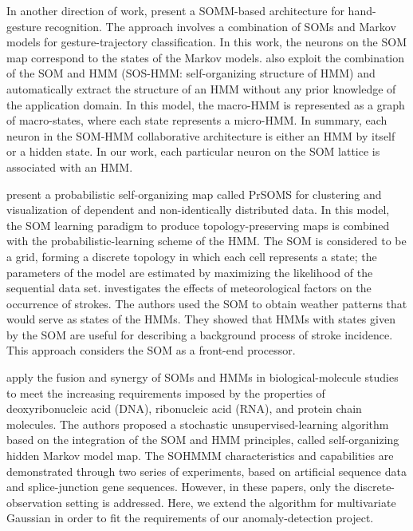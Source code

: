 In another direction of work, \citet{Caridakis2010} present a SOMM-based architecture for hand-gesture recognition. The approach involves a combination of SOMs and Markov models for gesture-trajectory classification. In this work, the neurons on the SOM map correspond to the states of the Markov models. \citet{Jaziri2011} also exploit the combination of the SOM and HMM (SOS-HMM: self-organizing structure of HMM) and automatically extract the structure of an HMM without any prior knowledge of the application domain. In this model, the macro-HMM is represented as a graph of macro-states, where each state represents a micro-HMM. In summary, each neuron in the SOM-HMM collaborative architecture is either an HMM by itself or a hidden state. In our work, each particular neuron on the SOM lattice is associated with an HMM.

\citet{Lebbah2015} present a probabilistic self-organizing map called PrSOMS for clustering and visualization of dependent and non-identically distributed data. In this model, the SOM learning paradigm to produce topology-preserving maps is combined with the probabilistic-learning scheme of the HMM. The SOM is considered to be a grid, forming a discrete topology in which each cell represents a state; the parameters of the model are estimated by maximizing the likelihood of the sequential data set. \citet{Morimoto2016} investigates the effects of meteorological factors on the occurrence of strokes. The authors used the SOM to obtain weather patterns that would serve as states of the HMMs. They showed that HMMs with states given by the SOM are useful for describing a background process of stroke incidence. This approach considers the SOM as a front-end processor.

\citet{Ferles2008,Ferles2013,Ferles2017} apply the fusion and synergy of SOMs and HMMs in biological-molecule studies to meet the increasing requirements imposed by the properties of deoxyribonucleic acid (DNA), ribonucleic acid (RNA), and protein chain molecules. The authors proposed a stochastic unsupervised-learning algorithm based on the integration of the SOM and HMM principles, called self-organizing hidden Markov model map. The SOHMMM characteristics and capabilities are demonstrated through two series of experiments, based on artificial sequence data and splice-junction gene sequences. However, in these papers, only the discrete-observation setting is addressed. Here, we extend the algorithm for multivariate Gaussian in order to fit the requirements of our anomaly-detection project.

